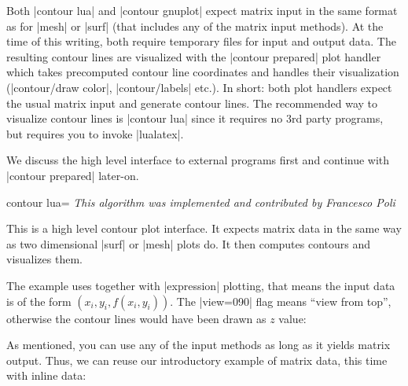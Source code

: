{{Both |contour lua| and |contour gnuplot| expect matrix input in the same format as for |mesh| or
|surf| (that includes any of the \PGFPlots{} matrix input methods). At the time of this writing, both require temporary files for input and output data.
The resulting contour lines are visualized with the |contour prepared| plot handler which takes precomputed contour line coordinates and handles their
visualization (|contour/draw color|, |contour/labels| etc.). In short: both plot handlers expect the usual matrix input and generate contour lines. The recommended way to visualize contour lines is |contour lua| since it requires no 3rd party programs, but requires you to invoke |lualatex|.

We discuss the high level interface to external programs first and continue
with |contour prepared| later-on.

\begin{plottype}[/pgfplots]{
    contour lua=\textcolor{black}{}%
}
{\emph{This algorithm was implemented and contributed by Francesco Poli}}

    This is a high level contour plot interface. It expects matrix data in the
    same way as two dimensional |surf| or |mesh| plots do. It then computes
    contours and visualizes them.
\pgfplotsexpensiveexample
\begin{codeexample}[]
\end{codeexample}
    \noindent The example uses  together with
    |expression| plotting, that means the input data is of the form
    $(x_i,y_i,f(x_i,y_i))$. The |view={0}{90}| flag means ``view from top'',
    otherwise the contour lines would have been drawn as $z$ value:
%
\pgfplotsexpensiveexample
\begin{codeexample}[]
\end{codeexample}

    As mentioned, you can use any of the \PGFPlots{} input methods as long as it
    yields matrix output. Thus, we can reuse our introductory example of matrix
    data, this time with inline data:
\pgfplotsexpensiveexample
\begin{codeexample}[]
\end{codeexample}
\end{plottype}}}
